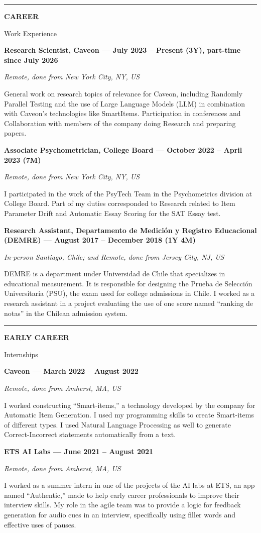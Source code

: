 \documentclass[10.5pt]{article}
\newcommand{\cvsection}[2]{%
  \Needspace{5\baselineskip}\par\vspace{20pt}%
  {\color{cvaccent}\rule{40pt}{3pt}}\par\vspace{7pt}
  {\fontsize{8.3}{10}\selectfont\bfseries\color{cvaccent} \MakeUppercase{#1}}\par\vspace{3pt}
  {\playfairsb\fontsize{20}{24}\selectfont\color{cvink} #2}\par\vspace{9pt}%
}
\newcommand{\jobentry}[4]{%
  \par\noindent\raggedright{\bfseries\color{cvink} #1}\par
  {\itshape\color{cvmuted} #2}\par
  {\color{cvink}#3}\par\vspace{9pt}%
}
\begin{document}
\cvsection{Career}{Work Experience}

\jobentry{Research Scientist, Caveon {\normalfont\color{cvmuted}--- July 2023 -- Present (3Y), part-time since July 2026}}
{Remote, done from New York City, NY, US}
{General work on research topics of relevance for Caveon, including Randomly
Parallel Testing and the use of Large Language Models (LLM) in combination with
Caveon's technologies like SmartItems\texttrademark. Participation in conferences and
Collaboration with members of the company doing Research and preparing papers.}
{caveon.png}

\jobentry{Associate Psychometrician, College Board {\normalfont\color{cvmuted}--- October 2022 -- April 2023 (7M)}}
{Remote, done from New York City, NY, US}
{I participated in the work of the PsyTech Team in the Psychometrics division at
College Board. Part of my duties corresponded to Research related to Item
Parameter Drift and Automatic Essay Scoring for the SAT Essay test.}
{collegeboard.png}

\jobentry{Research Assistant, Departamento de Medici\'on y Registro Educacional (DEMRE) {\normalfont\color{cvmuted}--- August 2017 -- December 2018 (1Y 4M)}}
{In-person Santiago, Chile; and Remote, done from Jersey City, NJ, US}
{DEMRE is a department under Universidad de Chile that specializes in educational
measurement. It is responsible for designing the Prueba de Selecci\'on Universitaria
(PSU), the exam used for college admissions in Chile. I worked as a research
assistant in a project evaluating the use of one score named ``ranking de notas'' in
the Chilean admission system.}
{demre.png}

\newpage
\cvsection{Early Career}{Internships}

\jobentry{Caveon {\normalfont\color{cvmuted}--- March 2022 -- August 2022}}
{Remote, done from Amherst, MA, US}
{I worked constructing ``Smart-items,'' a technology developed by the company for Automatic
Item Generation. I used my programming skills to create Smart-items of different types. I used
Natural Language Processing as well to generate Correct-Incorrect statements automatically
from a text.}
{caveon.png}

\jobentry{ETS AI Labs {\normalfont\color{cvmuted}--- June 2021 -- August 2021}}
{Remote, done from Amherst, MA, US}
{I worked as a summer intern in one of the projects of the AI labs at ETS, an app named
``Authentic,'' made to help early career professionals to improve their interview skills. My role
in the agile team was to provide a logic for feedback generation for audio cues in an interview,
specifically using filler words and effective uses of pauses.}
{ets_ai.png}
\end{document}
